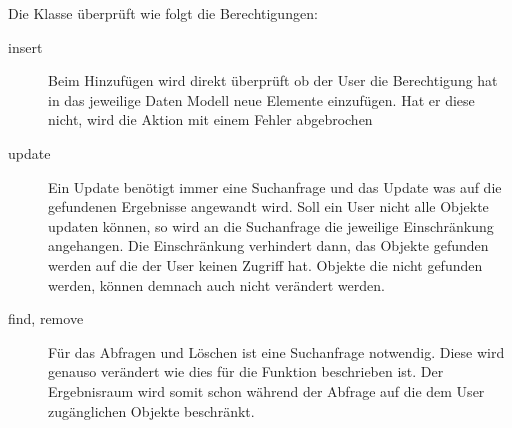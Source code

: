 Die Klasse  überprüft wie folgt die Berechtigungen:
\begin{description}
\item[insert] Beim Hinzufügen wird direkt überprüft ob der User die Berechtigung hat in das jeweilige Daten Modell neue Elemente einzufügen. Hat er diese nicht, wird die Aktion mit einem Fehler abgebrochen
\item[update] Ein Update benötigt immer eine Suchanfrage und das Update was auf die gefundenen Ergebnisse angewandt wird. Soll ein User nicht alle Objekte updaten können, so wird an die Suchanfrage die jeweilige Einschränkung angehangen. Die Einschränkung verhindert dann, das Objekte gefunden werden auf die der User keinen Zugriff hat. Objekte die nicht gefunden werden, können demnach auch nicht verändert werden.
\item[find, remove] Für das Abfragen und Löschen ist eine Suchanfrage notwendig. Diese wird genauso verändert wie dies für die  Funktion beschrieben ist. Der Ergebnisraum wird somit schon während der Abfrage auf die dem User zugänglichen Objekte beschränkt.
\end{description}
